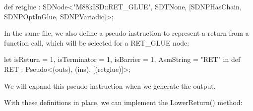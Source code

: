 \begin{cpp}
def retglue : SDNode<"M88kISD::RET_GLUE", SDTNone,
                [SDNPHasChain, SDNPOptInGlue, SDNPVariadic]>;
\end{cpp}

In the same file, we also define a pseudo-instruction to represent a return from a function call, which will be selected for a RET\_GLUE node:

\begin{cpp}
let isReturn = 1, isTerminator = 1, isBarrier = 1,
        AsmString = "RET" in
    def RET : Pseudo<(outs), (ins), [(retglue)]>;
\end{cpp}

We will expand this pseudo-instruction when we generate the output.

With these definitions in place, we can implement the LowerReturn() method:

